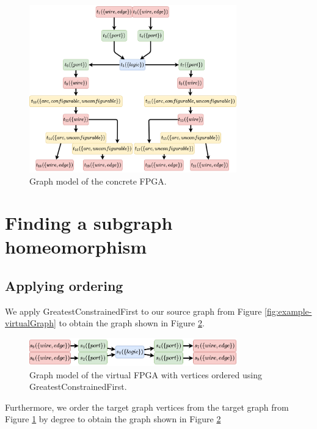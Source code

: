 \begin{figure}[h]
\centering
\includegraphics[width=0.8\textwidth]{images/endToEnd/concreteFPGAGraph.png}
\caption{Graph model of the concrete FPGA.}
\label{fig:example-concreteGraph}
\end{figure}	


\section{Finding a subgraph homeomorphism}
\subsection{Applying ordering}
We apply GreatestConstrainedFirst to our source graph from Figure \ref{fig:example-virtualGraph} to obtain the graph shown in Figure \ref{fig:example-virtualGraphOrdered}.

\begin{figure}
\centering
\includegraphics[width=0.8\textwidth]{images/endToEnd/virtualFPGAGraphOrdered.png}
\caption{Graph model of the virtual FPGA with vertices ordered using GreatestConstrainedFirst.}
\label{fig:example-virtualGraphOrdered}
\end{figure}

Furthermore, we order the target graph vertices from the target graph from Figure \ref{fig:example-concreteGraph}
by degree to obtain the graph shown in Figure \ref{fig:example-virtualGraphOrdered}

